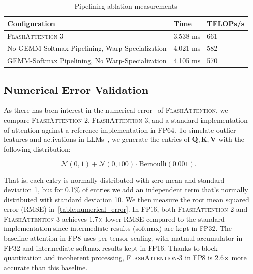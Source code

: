 \begin{table}[h!]
  \centering  
  \caption{Pipelining ablation measurements}
  \label{table:ablation_pipelining}
  \begin{tabular}{|l|l|l|}
      \hline
      \textbf{Configuration} & \textbf{Time} & \textbf{TFLOPs/s} \\
      \hline
      \textsc{FlashAttention-3} & 3.538 ms & 661 \\
      \hline
      No GEMM-Softmax Pipelining, Warp-Specialization & 4.021 ms & 582 \\
      \hline
      GEMM-Softmax Pipelining, No Warp-Specialization & 4.105 ms & 570 \\
      \hline
  \end{tabular}

\end{table}

\subsection{Numerical Error Validation}
\label{sec:numerical_error}

As there has been interest in the numerical error~\citep{golden2024flash} of
\textsc{FlashAttention}, we compare \textsc{FlashAttention-2}, \textsc{FlashAttention-3}, and a standard implementation of attention against a reference implementation in FP64. To simulate outlier features and activations in LLMs~\citep{dettmers2208llm,
  sun2024massive}, we generate the entries of $\mathbf{Q}, \mathbf{K}, \mathbf{V}$ with the following distribution:

\begin{equation*}
  \mathcal{N}(0, 1) + \mathcal{N}(0, 100) \cdot \mathrm{Bernoulli}(0.001).
\end{equation*}

That is, each entry is normally distributed with zero mean and standard deviation 1, but for 0.1\% of entries we add an independent term that's normally distributed with standard deviation 10. We then measure the root mean squared error (RMSE) in~\cref{table:numerical_error}.
In FP16, both \textsc{FlashAttention-2} and \textsc{FlashAttention-3} achieves 1.7$\times$ lower RMSE compared to the standard implementation since intermediate results (softmax) are kept in FP32. The baseline attention in FP8 uses per-tensor scaling, with matmul accumulator in FP32 and intermediate softmax results kept in FP16. Thanks to block quantization and incoherent processing, \textsc{FlashAttention-3} in FP8 is 2.6$\times$ more accurate than this baseline.


